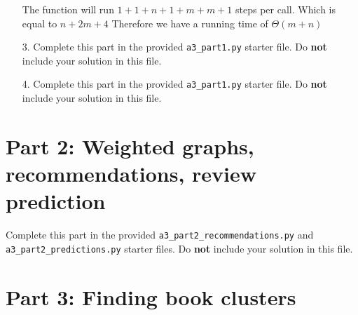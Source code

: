 \documentclass[11pt]{article}
\begin{document}
\begin{enumerate}
The function will run $1 + 1 + n + 1 + m + m + 1$ steps per call. Which is equal to $n + 2m + 4$ Therefore we have a running time of $\Theta(m + n)$ \\


\item[3.]
Complete this part in the provided \texttt{a3\_part1.py} starter file.
Do \textbf{not} include your solution in this file.

\item[4.]
Complete this part in the provided \texttt{a3\_part1.py} starter file.
Do \textbf{not} include your solution in this file.

\end{enumerate}

\section*{Part 2: Weighted graphs, recommendations, review prediction}

Complete this part in the provided \texttt{a3\_part2\_recommendations.py} and \texttt{a3\_part2\_predictions.py} starter files.
Do \textbf{not} include your solution in this file.

\newpage

\section*{Part 3: Finding book clusters}
\end{document}
